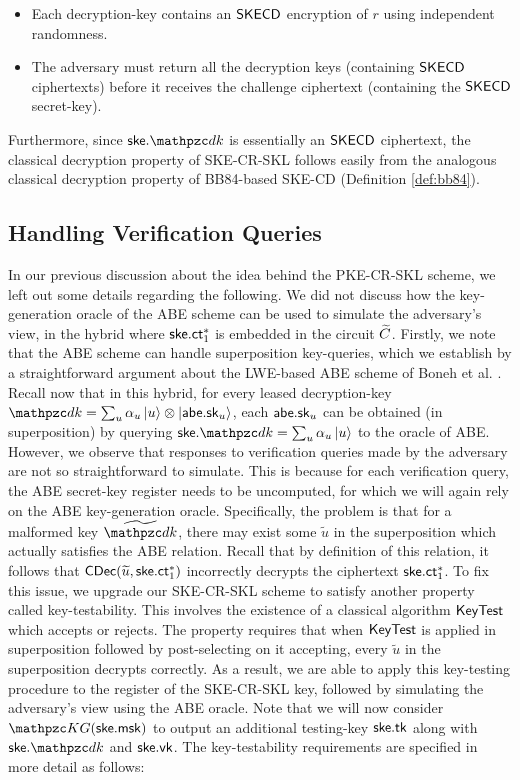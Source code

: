 \begin{itemize}
\item Each decryption-key contains an $\mathsf{SKECD}$ encryption of $r$ using
independent randomness.
\item The adversary must return all the decryption keys (containing
$\mathsf{SKECD}$ ciphertexts) before it receives the challenge ciphertext
(containing the $\mathsf{SKECD}$ secret-key).
\end{itemize}
Furthermore, since $\ske.\qdk$ is essentially an
$\mathsf{SKECD}$ ciphertext, the classical decryption property of SKE-CR-SKL
follows easily from the analogous classical decryption property of
BB84-based SKE-CD (Definition \ref{def:bb84}).

\subsection{Handling Verification Queries}

In our previous discussion about the idea behind the PKE-CR-SKL
scheme, we left out some details regarding the following. We did not discuss how the key-generation oracle of the ABE scheme can be used to
simulate the adversary's view, in the hybrid where $\mathsf{ske}.\mathsf{ct}_1^*$ is
embedded in the circuit $\widetilde{C}$. Firstly, we note that the ABE scheme
can handle superposition key-queries, which we establish by a
straightforward argument about the LWE-based ABE scheme of Boneh et
al.
\cite{EC:BGGHNS14}.
Recall now that in this hybrid, for every leased
decryption-key $\qdk = \sum_u \alpha_u \ket{u} \otimes
\ket{\abe.\sk_u}$, each
$\mathsf{abe}.\mathsf{sk}_u$ can be obtained (in superposition) by querying $\ske.\qdk
= \sum_u
\alpha_u \ket{u}$ to the oracle of ABE. However, we observe that responses to
verification queries made by the adversary are not so straightforward
to simulate. This is because for each verification query, the ABE
secret-key register needs to be uncomputed, for which we will again
rely on the ABE key-generation oracle. Specifically, the problem is
that for a malformed key $\widetilde{\qdk}$, there may exist some
$\widetilde{u}$ in the superposition which actually satisfies the ABE
relation. Recall that by definition of this relation, it follows that
$\mathsf{CDec}(\widetilde{u}, \mathsf{ske}.\mathsf{ct}_1^*)$ incorrectly decrypts the 
ciphertext $\mathsf{ske}.\mathsf{ct}_1^*$.
To fix this issue, we upgrade our SKE-CR-SKL
scheme to satisfy another property called key-testability. This
involves the existence of a classical algorithm $\mathsf{KeyTest}$ which
accepts or rejects. The property requires that when $\mathsf{KeyTest}$ is
applied in superposition followed by post-selecting on it accepting,
every $\widetilde{u}$ in the superposition decrypts correctly. As a
result, we are able to apply this key-testing procedure to the
register of the SKE-CR-SKL key, followed by simulating the adversary's
view using the ABE oracle. Note that we will now consider
$\qKG(\ske.\msk)$ to output an additional testing-key $\mathsf{ske}.\mathsf{tk}$ along
with $\ske.\qdk$ and $\mathsf{ske}.\mathsf{vk}$. The key-testability requirements are
specified in more detail as follows:

